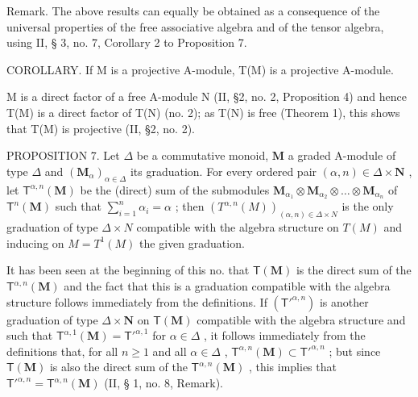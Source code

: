 Remark. The above results can equally be obtained as a consequence of the universal properties of the free associative algebra and of the tensor algebra, using II, § 3, no. 7, Corollary 2 to Proposition 7.

COROLLARY. If M is a projective A-module, T(M) is a projective A-module.

M is a direct factor of a free A-module N (II, §2, no. 2, Proposition 4) and hence T(M) is a direct factor of T(N) (no. 2); as T(N) is free (Theorem 1), this shows that T(M) is projective (II, §2, no. 2).

PROPOSITION 7. Let \(\Delta\) be a commutative monoid, \(\mathbf{M}\) a graded A-module of type \(\Delta\) and \((\mathbf{M}_{\alpha})_{\alpha \in \Delta}\) its graduation. For every ordered pair \((\alpha, n) \in \Delta \times \mathbf{N}\) , let \(\mathsf{T}^{\alpha,n}(\mathbf{M})\) be the (direct) sum of the submodules \(\mathbf{M}_{\alpha_1} \otimes \mathbf{M}_{\alpha_2} \otimes \dots \otimes \mathbf{M}_{\alpha_n}\) of \(\mathsf{T}^n(\mathbf{M})\) such that \(\sum_{i=1}^{n} \alpha_i = \alpha\) ; then \((T^{\alpha, n}(M))_{(\alpha, n) \in \Delta \times N}\) is the only graduation of type \(\Delta \times N\) compatible with the algebra structure on \(T(M)\) and inducing on \(M = T^1(M)\) the given graduation.

It has been seen at the beginning of this no. that \(\mathsf{T}(\mathbf{M})\) is the direct sum of the \(\mathsf{T}^{\alpha,n}(\mathbf{M})\) and the fact that this is a graduation compatible with the algebra structure follows immediately from the definitions. If \((\mathsf{T}'^{\alpha,n})\) is another graduation of type \(\Delta \times \mathbf{N}\) on \(\mathsf{T}(\mathbf{M})\) compatible with the algebra structure and such that \(\mathsf{T}^{\alpha,1}(\mathbf{M}) = \mathsf{T}'^{\alpha,1}\) for \(\alpha \in \Delta\) , it follows immediately from the definitions that, for all \(n \geqslant 1\) and all \(\alpha \in \Delta\) , \(\mathsf{T}^{\alpha,n}(\mathbf{M}) \subset \mathsf{T}'^{\alpha,n}\) ; but since \(\mathsf{T}(\mathbf{M})\) is also the direct sum of the \(\mathsf{T}^{\alpha,n}(\mathbf{M})\) , this implies that \(\mathsf{T}'^{\alpha,n} = \mathsf{T}^{\alpha,n}(\mathbf{M})\) (II, § 1, no. 8, Remark).

